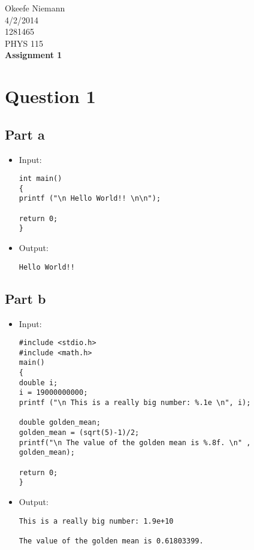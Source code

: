 \documentclass[10pt]{article}
\begin{document}
 
\begin{center}
\large
\hfill Okeefe Niemann\\
\hfill 4/2/2014\\
\hfill 1281465\\
\hfill PHYS 115 \\
\LARGE \textbf{Assignment 1}\\
\end{center}
\normalsize
\section{Question 1}
\subsection{Part a}
\begin{itemize}

\item Input:
\begin{verbatim}
int main()
{
printf ("\n Hello World!! \n\n");

return 0;
}
\end{verbatim}

\item Output:
\begin{verbatim}
Hello World!!
\end{verbatim}
\end{itemize}


\subsection{Part b}
\begin{itemize}
\item Input:
\begin{verbatim}
#include <stdio.h>
#include <math.h>
main()
{
double i;
i = 19000000000;
printf ("\n This is a really big number: %.1e \n", i);

double golden_mean;
golden_mean = (sqrt(5)-1)/2;
printf("\n The value of the golden mean is %.8f. \n" , golden_mean);

return 0;
}
\end{verbatim}

\item Output:
\begin{verbatim}
This is a really big number: 1.9e+10 

The value of the golden mean is 0.61803399. 
\end{verbatim}
\end{itemize}
\end{document}
